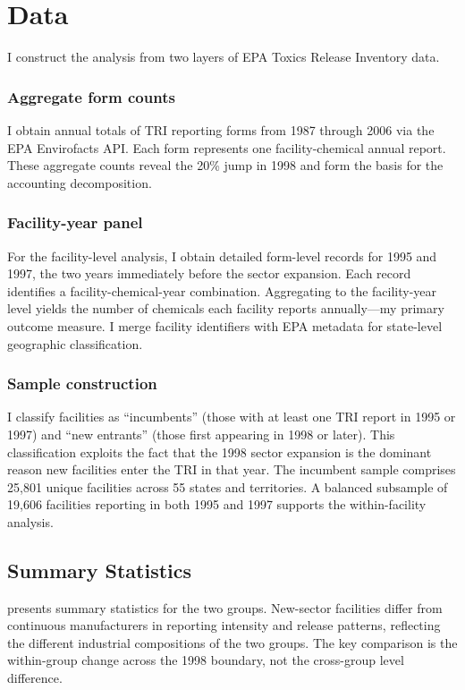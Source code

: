 \documentclass[12pt]{article}
\begin{document}
\section{Data}

I construct the analysis from two layers of EPA Toxics Release Inventory data.

\subsubsection*{Aggregate form counts} I obtain annual totals of TRI reporting forms from 1987 through 2006 via the EPA Envirofacts API. Each form represents one facility-chemical annual report. These aggregate counts reveal the 20\% jump in 1998 and form the basis for the accounting decomposition.

\subsubsection*{Facility-year panel} For the facility-level analysis, I obtain detailed form-level records for 1995 and 1997, the two years immediately before the sector expansion. Each record identifies a facility-chemical-year combination. Aggregating to the facility-year level yields the number of chemicals each facility reports annually---my primary outcome measure. I merge facility identifiers with EPA metadata for state-level geographic classification.

\subsubsection*{Sample construction} I classify facilities as ``incumbents'' (those with at least one TRI report in 1995 or 1997) and ``new entrants'' (those first appearing in 1998 or later). This classification exploits the fact that the 1998 sector expansion is the dominant reason new facilities enter the TRI in that year. The incumbent sample comprises 25,801 unique facilities across 55 states and territories. A balanced subsample of 19,606 facilities reporting in both 1995 and 1997 supports the within-facility analysis.

\subsection{Summary Statistics}



 presents summary statistics for the two groups. New-sector facilities differ from continuous manufacturers in reporting intensity and release patterns, reflecting the different industrial compositions of the two groups. The key comparison is the within-group change across the 1998 boundary, not the cross-group level difference.
\end{document}
